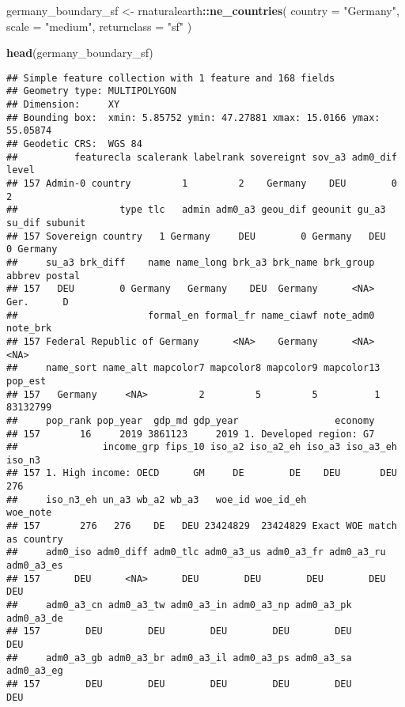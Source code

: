 \documentclass[
]{article}
\newenvironment{Shaded}{\begin{snugshade}}{\end{snugshade}}
\newcommand{\AttributeTok}[1]{\textcolor[rgb]{0.13,0.29,0.53}{#1}}
\newcommand{\FunctionTok}[1]{\textcolor[rgb]{0.13,0.29,0.53}{\textbf{#1}}}
\newcommand{\NormalTok}[1]{#1}
\newcommand{\OtherTok}[1]{\textcolor[rgb]{0.56,0.35,0.01}{#1}}
\newcommand{\SpecialCharTok}[1]{\textcolor[rgb]{0.81,0.36,0.00}{\textbf{#1}}}
\newcommand{\StringTok}[1]{\textcolor[rgb]{0.31,0.60,0.02}{#1}}
\begin{document}
\begin{Shaded}
\begin{Highlighting}[]
\NormalTok{germany\_boundary\_sf }\OtherTok{\textless{}{-}}\NormalTok{ rnaturalearth}\SpecialCharTok{::}\FunctionTok{ne\_countries}\NormalTok{(}
  \AttributeTok{country =} \StringTok{"Germany"}\NormalTok{,}
  \AttributeTok{scale =} \StringTok{"medium"}\NormalTok{,}
  \AttributeTok{returnclass =} \StringTok{"sf"}
\NormalTok{)}

\FunctionTok{head}\NormalTok{(germany\_boundary\_sf)}
\end{Highlighting}
\end{Shaded}

\begin{verbatim}
## Simple feature collection with 1 feature and 168 fields
## Geometry type: MULTIPOLYGON
## Dimension:     XY
## Bounding box:  xmin: 5.85752 ymin: 47.27881 xmax: 15.0166 ymax: 55.05874
## Geodetic CRS:  WGS 84
##          featurecla scalerank labelrank sovereignt sov_a3 adm0_dif level
## 157 Admin-0 country         1         2    Germany    DEU        0     2
##                  type tlc   admin adm0_a3 geou_dif geounit gu_a3 su_dif subunit
## 157 Sovereign country   1 Germany     DEU        0 Germany   DEU      0 Germany
##     su_a3 brk_diff    name name_long brk_a3 brk_name brk_group abbrev postal
## 157   DEU        0 Germany   Germany    DEU  Germany      <NA>   Ger.      D
##                       formal_en formal_fr name_ciawf note_adm0 note_brk
## 157 Federal Republic of Germany      <NA>    Germany      <NA>     <NA>
##     name_sort name_alt mapcolor7 mapcolor8 mapcolor9 mapcolor13  pop_est
## 157   Germany     <NA>         2         5         5          1 83132799
##     pop_rank pop_year  gdp_md gdp_year                 economy
## 157       16     2019 3861123     2019 1. Developed region: G7
##               income_grp fips_10 iso_a2 iso_a2_eh iso_a3 iso_a3_eh iso_n3
## 157 1. High income: OECD      GM     DE        DE    DEU       DEU    276
##     iso_n3_eh un_a3 wb_a2 wb_a3   woe_id woe_id_eh                   woe_note
## 157       276   276    DE   DEU 23424829  23424829 Exact WOE match as country
##     adm0_iso adm0_diff adm0_tlc adm0_a3_us adm0_a3_fr adm0_a3_ru adm0_a3_es
## 157      DEU      <NA>      DEU        DEU        DEU        DEU        DEU
##     adm0_a3_cn adm0_a3_tw adm0_a3_in adm0_a3_np adm0_a3_pk adm0_a3_de
## 157        DEU        DEU        DEU        DEU        DEU        DEU
##     adm0_a3_gb adm0_a3_br adm0_a3_il adm0_a3_ps adm0_a3_sa adm0_a3_eg
## 157        DEU        DEU        DEU        DEU        DEU        DEU

\end{verbatim}
\end{document}
